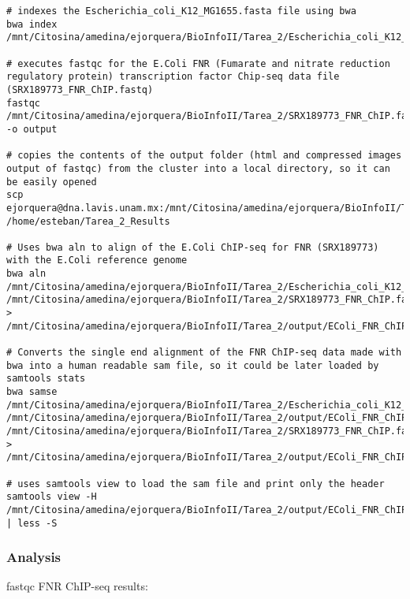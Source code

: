 \documentclass[
]{article}
\begin{document}
\begin{verbatim}
# indexes the Escherichia_coli_K12_MG1655.fasta file using bwa
bwa index /mnt/Citosina/amedina/ejorquera/BioInfoII/Tarea_2/Escherichia_coli_K12_MG1655.fasta

# executes fastqc for the E.Coli FNR (Fumarate and nitrate reduction regulatory protein) transcription factor Chip-seq data file (SRX189773_FNR_ChIP.fastq)
fastqc /mnt/Citosina/amedina/ejorquera/BioInfoII/Tarea_2/SRX189773_FNR_ChIP.fastq -o output

# copies the contents of the output folder (html and compressed images output of fastqc) from the cluster into a local directory, so it can be easily opened 
scp ejorquera@dna.lavis.unam.mx:/mnt/Citosina/amedina/ejorquera/BioInfoII/Tarea_2/output/* /home/esteban/Tarea_2_Results

# Uses bwa aln to align of the E.Coli ChIP-seq for FNR (SRX189773) with the E.Coli reference genome
bwa aln /mnt/Citosina/amedina/ejorquera/BioInfoII/Tarea_2/Escherichia_coli_K12_MG1655.fasta /mnt/Citosina/amedina/ejorquera/BioInfoII/Tarea_2/SRX189773_FNR_ChIP.fastq > /mnt/Citosina/amedina/ejorquera/BioInfoII/Tarea_2/output/EColi_FNR_ChIP.sai

# Converts the single end alignment of the FNR ChIP-seq data made with bwa into a human readable sam file, so it could be later loaded by samtools stats
bwa samse /mnt/Citosina/amedina/ejorquera/BioInfoII/Tarea_2/Escherichia_coli_K12_MG1655.fasta /mnt/Citosina/amedina/ejorquera/BioInfoII/Tarea_2/output/EColi_FNR_ChIP.sai /mnt/Citosina/amedina/ejorquera/BioInfoII/Tarea_2/SRX189773_FNR_ChIP.fastq > /mnt/Citosina/amedina/ejorquera/BioInfoII/Tarea_2/output/EColi_FNR_ChIP.sam

# uses samtools view to load the sam file and print only the header
samtools view -H /mnt/Citosina/amedina/ejorquera/BioInfoII/Tarea_2/output/EColi_FNR_ChIP.sam | less -S
\end{verbatim}

\hypertarget{analysis}{%
\subsubsection{Analysis}\label{analysis}}

fastqc FNR ChIP-seq results:
\end{document}
